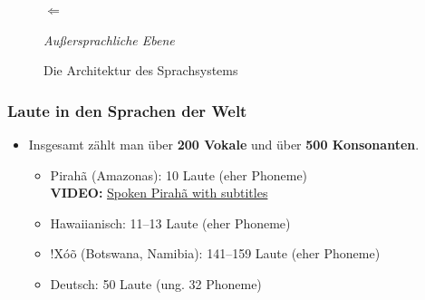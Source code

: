 \begin{frame}
\begin{figure}
	\begin{minipage}{0.24\textwidth}
		\centering
	\end{minipage}
	\begin{minipage}[c]{0.05\textwidth}
		\hfill
	\end{minipage}
	\begin{minipage}{0.24\textwidth}
		\centering
	\end{minipage}
	\begin{minipage}{0.1\textwidth}
		\centering
		\Large
		$\Leftarrow$
	\end{minipage}
	\begin{minipage}{0.3\textwidth}
	\end{minipage}
	
	\begin{minipage}{0.65\textwidth}
		\hfill
	\end{minipage}
	\begin{minipage}{0.3\textwidth}
		\centering
		\small
		\textit{Außersprachliche Ebene}
	\end{minipage}
	\caption{Die Architektur des Sprachsystems \citep[vgl.][]{Abramowski2016}}
\end{figure}

\end{frame}


\begin{frame}
\frametitle{Laute in den Sprachen der Welt}

\begin{itemize}
	\item Insgesamt zählt man über \textbf{200 Vokale} und über \textbf{500 Konsonanten}.
	
		\begin{itemize}
			\item Pirahã (Amazonas): 10 Laute (eher Phoneme)\\
				\textbf{VIDEO:} \href{run:material/04SpokenPiraha.mp4}{Spoken Pirahã with subtitles}
			\item Hawaiianisch: 11--13 Laute (eher Phoneme)
			\item {!}Xóõ (Botswana, Namibia): 141--159 Laute (eher Phoneme)
			\item Deutsch: 50 Laute (ung. 32 Phoneme)
		\end{itemize}
		
\end{itemize}
	
\end{frame}


